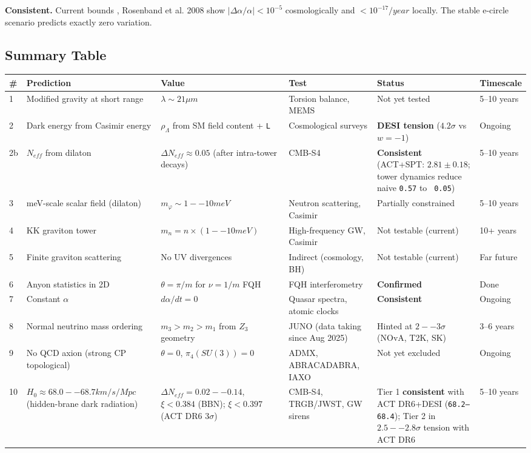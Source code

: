 \documentclass[aps,prd,preprint,superscriptaddress,longbibliography,floatfix]{revtex4-2}
\theoremstyle{remark}
\begin{document}
\textbf{Consistent.} Current bounds \cite{Webbetal2011}, Rosenband et al. 2008 show $|\Delta\alpha/\alpha| < 10^{-5}$ cosmologically and $< 10^{-17}/year$ locally. The stable e-circle scenario predicts exactly zero variation.



\subsection{Summary Table}


\begin{table}[H]
\begin{ruledtabular}
\begin{tabular}{p{2.5cm}p{2.5cm}p{2.5cm}p{2.5cm}p{2.5cm}p{2.5cm}}
\# & Prediction & Value & Test & Status & Timescale \\
\hline
1 & Modified gravity at short range & $\lambda \sim  21 \mu m$ & Torsion balance, MEMS & Not yet tested & 5--10 years \\
2 & Dark energy from Casimir energy & $\rho_\Lambda$ from SM field content + \texttt{L} & Cosmological surveys & \textbf{DESI tension} ($4.2\sigma$ vs $w=-1$) & Ongoing \\
2b & $N_{eff}$ from dilaton & $\Delta N_{eff} \approx 0.05$ (after intra-tower decays) & CMB-S4 & \textbf{Consistent} (ACT+SPT: $2.81\pm0.18$; tower dynamics reduce naive \texttt{0.57} to \texttt{~0.05}) & 5--10 years \\
3 & meV-scale scalar field (dilaton) & $m_\varphi \sim  1--10 meV$ & Neutron scattering, Casimir & Partially constrained & 5--10 years \\
4 & KK graviton tower & $m_n = n \times (1--10 meV)$ & High-frequency GW, Casimir & Not testable (current) & 10+ years \\
5 & Finite graviton scattering & No UV divergences & Indirect (cosmology, BH) & Not testable (current) & Far future \\
6 & Anyon statistics in 2D & $\theta = \pi/m$ for $\nu = 1/m$ FQH & FQH interferometry & \textbf{Confirmed} & Done \\
7 & Constant $\alpha$ & $d\alpha/dt = 0$ & Quasar spectra, atomic clocks & \textbf{Consistent} & Ongoing \\
8 & Normal neutrino mass ordering & $m_{3} > m_{2} > m_{1}$ from $Z_{3}$ geometry & JUNO (data taking since Aug 2025) & Hinted at $2--3\sigma$ (NOvA, T2K, SK) & 3--6 years \\
9 & No QCD axion (strong CP topological) & $\theta = 0$, $\pi_{4}(SU(3)) = 0$ & ADMX, ABRACADABRA, IAXO & Not yet excluded & Ongoing \\
10 & $H_{0} \approx 68.0--68.7 km/s/Mpc$ (hidden-brane dark radiation) & $\Delta N_{eff} = 0.02--0.14$, $\xi < 0.384$ (BBN); $\xi < 0.397$ (ACT DR6 $3\sigma$) & CMB-S4, TRGB/JWST, GW sirens & Tier 1 \textbf{consistent} with ACT DR6+DESI (\texttt{68.2--68.4}); Tier 2 in $2.5--2.8\sigma$ tension with ACT DR6 & 5--10 years \\
\end{tabular}
\end{ruledtabular}
\end{table}
\end{document}
